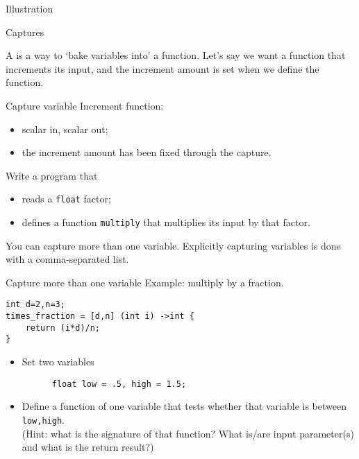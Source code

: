 \begin{block}{Illustration}
  \label{sl:lambda-classed}
\end{block}

 {Captures}

A  is a way to `bake variables into' a function.
Let's say we want a function that increments its input,
and the increment amount is set when we define the function.

\begin{block}{Capture variable}
  \label{sl:capture-increment}
  Increment function:
  \begin{itemize}
  \item scalar in, scalar out;
  \item the increment amount has been fixed through the capture.
  \end{itemize}
\end{block}

\begin{exercise}
  \label{ex:capture-factor}
  Write a program that 
  \begin{itemize}
  \item reads a \lstinline{float} factor;
  \item defines a function \lstinline{multiply} that
    multiplies its input by that factor.
  \end{itemize}
\end{exercise}

You can capture more than one variable.
Explicitly capturing variables is done with a comma-separated list.

\begin{block}{Capture more than one variable}
  \label{sl:capture-fraction}
  Example: multiply by a fraction.
\begin{lstlisting}
int d=2,n=3;
times_fraction = [d,n] (int i) ->int {
    return (i*d)/n;
}
\end{lstlisting}
\end{block}

\begin{exercise}
  \label{ex:capture-between}
  \begin{itemize}
  \item Set two variables 
    \begin{lstlisting}
      float low = .5, high = 1.5;
    \end{lstlisting}
  \item Define a function of one variable that tests
    whether that variable is between \lstinline{low,high}.\\
    (Hint: what is the signature of that function?
    What is/are input parameter(s) and what is the return result?)
  \end{itemize}
\end{exercise}

